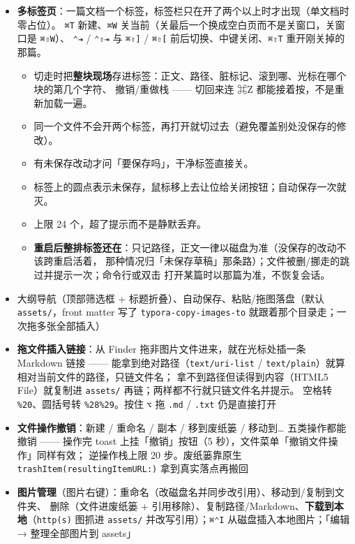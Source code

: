 \documentclass[11pt,a4paper]{ctexart}
\begin{document}
\begin{itemize}
\begin{itemize}
目标不存在时问一句「要新建吗」
\end{itemize}
\item \textbf{多标签页}：一篇文档一个标签，标签栏只在开了两个以上时才出现（单文档时零占位）。
\texttt{⌘T} 新建、\texttt{⌘W} 关当前（关最后一个换成空白页而不是关窗口，关窗口是 \texttt{⌘⇧W}）、
\texttt{⌃⇥} / \texttt{⌃⇧⇥} 与 \texttt{⌘⇧]} / \texttt{⌘⇧[} 前后切换、中键关闭、\texttt{⌘⇧T} 重开刚关掉的那篇。
\begin{itemize}
\item 切走时把\textbf{整块现场}存进标签：正文、路径、脏标记、滚到哪、光标在哪个块的第几个字符、
撤销/重做栈 —— 切回来连 ⌘Z 都能接着按，不是重新加载一遍。
\item 同一个文件不会开两个标签，再打开就切过去（避免覆盖别处没保存的修改）。
\item 有未保存改动才问「要保存吗」，干净标签直接关。
\item 标签上的圆点表示未保存，鼠标移上去让位给关闭按钮；自动保存一次就灭。
\item 上限 24 个，超了提示而不是静默丢弃。
\item \textbf{重启后整排标签还在}：只记路径，正文一律以磁盘为准（没保存的改动不该跨重启活着，
那种情况归「未保存草稿」那条路）；文件被删/挪走的跳过并提示一次；命令行或双击
打开某篇时以那篇为准，不恢复会话。
\end{itemize}
\item 大纲导航（顶部筛选框 + 标题折叠）、自动保存、粘贴/拖图落盘（默认 \texttt{assets/}，front
matter 写了 \texttt{typora-copy-images-to} 就跟着那个目录走；一次拖多张全部插入）
\item \textbf{拖文件插入链接}：从 Finder 拖非图片文件进来，就在光标处插一条 Markdown 链接 ——
能拿到绝对路径（\texttt{text/uri-list} / \texttt{text/plain}）就算相对当前文件的路径，只链文件名；
拿不到路径但读得到内容（HTML5 File）就复制进 \texttt{assets/} 再链；两样都不行就只链文件名并提示。
空格转 \texttt{\%20}、圆括号转 \texttt{\%28\%29}。按住 \texttt{⌥} 拖 \texttt{.md} / \texttt{.txt} 仍是直接打开
\item \textbf{文件操作撤销}：新建 / 重命名 / 副本 / 移到废纸篓 / 移动到… 五类操作都能撤销 ——
操作完 toast 上挂「撤销」按钮（5 秒），文件菜单「撤销文件操作」同样有效；
逆操作栈上限 20 步。废纸篓靠原生 \texttt{trashItem(resultingItemURL:)} 拿到真实落点再搬回
\item \textbf{图片管理}（图片右键）：重命名（改磁盘名并同步改引用）、移动到/复制到文件夹、
删除（文件进废纸篓 + 引用移除）、复制路径/Markdown、\textbf{下载到本地}（\texttt{http(s)} 图抓进
\texttt{assets/} 并改写引用）；\texttt{⌘⌃I} 从磁盘插入本地图片；「编辑 → 整理全部图片到 assets」

\end{itemize}
\end{document}
